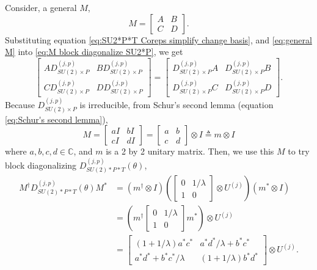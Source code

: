 \documentclass[preprint, 12pt]{revtex4-2}
\numberwithin{equation}{section}
\begin{document}
Consider, a general $M$,
\begin{equation}\label{eq:general M}
    M = \begin{bmatrix}
        A & B \\
        C & D
    \end{bmatrix}.
\end{equation}
Substituting equation \ref{eq:SU2*P*T Coreps simplify change basis}, and \ref{eq:general M} into \ref{eq:M block diagonalize SU2*P}, we get
\begin{equation}\label{eq:substitute M}
    \begin{bmatrix}
        AD_{SU(2)\times P}^{(j,p)} & BD_{SU(2)\times P}^{(j,p)} \\
        CD_{SU(2)\times P}^{(j,p)} & DD_{SU(2)\times P}^{(j,p)}  
        \end{bmatrix} = \begin{bmatrix}
            D_{SU(2)\times P}^{(j,p)}A & D_{SU(2)\times P}^{(j,p)}B \\
            D_{SU(2)\times P}^{(j,p)}C & D_{SU(2)\times P}^{(j,p)}D  
            \end{bmatrix}.
\end{equation}
Because $D_{SU(2)\times P}^{(j,p)}$ is irreducible, from Schur's second lemma (equation \ref{eq:Schur's second lemma}),
\begin{equation}\label{eq:M conditions}
    M = \begin{bmatrix}
        aI & bI \\
        cI & dI
    \end{bmatrix} = \begin{bmatrix}
        a & b \\
        c & d
    \end{bmatrix}\otimes I \triangleq m\otimes I
\end{equation}
where $a, b, c, d\in\mathbb{C}$, and $m$ is a 2 by 2 unitary matrix. Then, we use this $M$ to try block diagonalizing $D_{SU(2)\ast P\ast T}^{(j,p)}(\theta)$,
\begin{equation}\label{eq:M block diagonalize T}
    \begin{aligned}
        M^\dagger D_{SU(2)\ast P\ast T}^{(j,p)}(\theta)M^\ast &= \left(m^\dagger\otimes I\right)\left(\begin{bmatrix}0&1/\lambda\\1&0\end{bmatrix}\otimes U^{(j)}\right)\left(m^\ast\otimes I\right) \\
        &= \left(m^\dagger\begin{bmatrix}0&1/\lambda\\1&0\end{bmatrix}  m^\ast\right)\otimes U^{(j)} \\
        &= \begin{bmatrix}(1+1/\lambda)a^\ast c^\ast & a^\ast d^\ast/\lambda + b^\ast c^\ast \\ a^\ast d^\ast + b^\ast c^\ast/\lambda & (1+1/\lambda)b^\ast d^\ast\end{bmatrix} \otimes U^{(j)}.
    \end{aligned}
\end{equation}
\end{document}
